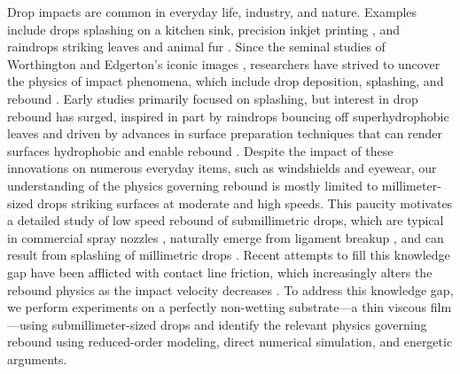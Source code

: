 \documentclass{jfm}
\begin{document}
Drop impacts are common in everyday life, industry, and nature. Examples include drops splashing on a kitchen sink, precision inkjet printing \citep{lohse2022fundamental}, and raindrops striking leaves and animal fur \citep{roth2022rain}. Since the seminal studies of Worthington \citep{worthington1877xxviii,worthington1908study} and Edgerton's iconic images \citep{edgerton1954flash}, researchers have strived to uncover the physics of impact phenomena, which include drop deposition, splashing, and rebound \citep{rein1993phenomena,yarin2006drop}. Early studies primarily focused on splashing, but interest in drop rebound has surged, inspired in part by raindrops bouncing off superhydrophobic leaves \citep{chen2011comparative} and driven by advances in surface preparation techniques that can render surfaces hydrophobic and enable rebound \citep{richard2000bouncing,okumura2003water}. Despite the impact of these innovations on numerous everyday items, such as windshields and eyewear, our understanding of the physics governing rebound is mostly limited to millimeter-sized drops striking surfaces at moderate and high speeds. This paucity motivates a detailed study of low speed rebound of submillimetric drops, which are typical in commercial spray nozzles \citep{makhnenko2021review,chen2022droplet}, naturally emerge from ligament breakup \citep{villermaux2020fragmentation}, and can result from splashing of millimetric drops \citep{yarin2006drop}. Recent attempts to fill this knowledge gap have been afflicted with contact line friction, which increasingly alters the rebound physics as the impact velocity decreases \citep{wang2022successive,thenarianto2023energy}. To address this knowledge gap, we perform experiments on a perfectly non-wetting substrate---a thin viscous film---using submillimeter-sized drops and identify the relevant physics governing rebound using reduced-order modeling, direct numerical simulation, and energetic arguments.
\end{document}
